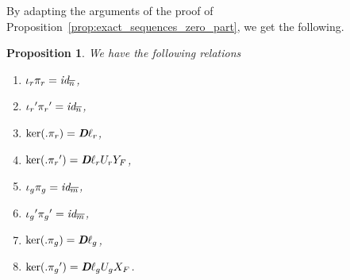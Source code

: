 \documentclass[10pt]{article}
\newtheorem{proposition}{Proposition}
\newcommand\g[1]{\textbf{#1}}
\newcommand\idd[1]{\emph{id}_{#1}}
\newcommand\D{\g{D}}
\begin{document}
By adapting the arguments of the proof of
Proposition~\ref{prop:exact_sequences_zero_part}, we get the following.

\begin{proposition}\label{prop:exact_sequences_id_rel_part}
  We have the following relations
  \begin{multicols}{2}
    \begin{enumerate}
    \item\label{it:split_pi_id_rel_part} $\iota_r\pi_r=\idd{\overline{n}}
      $,
    \item\label{it:split_pip_id_rel_part} ${\iota_r}'{\pi_r}'=\idd{
      \overline{n}}$,
    \item\label{it:ker_pi_id_rel_part} $\ker(.\pi_r)=\emph{\D}\ell_r$,
    \item\label{it:ker_pip_id_rel_part} $\ker(.{\pi_r}')=\emph{\D}
      \ell_rU_rY_F$,
    \item\label{it:split_pi_id_gen_part} $\iota_g\pi_g=\idd{\overline{m}}
      $,
    \item\label{it:split_pip_id_gen_part} ${\iota_g}'{\pi_g}'=\idd{
      \overline{m}}$,
    \item\label{it:ker_pi_id_gen_part} $\ker(.\pi_g)=\emph{\D}\ell_g$,
    \item\label{it:ker_pip_id_gen_part} $\ker(.{\pi_g}')=\emph{\D}
      \ell_gU_gX_F$.
    \end{enumerate}
  \end{multicols}
\end{proposition}
\end{document}
